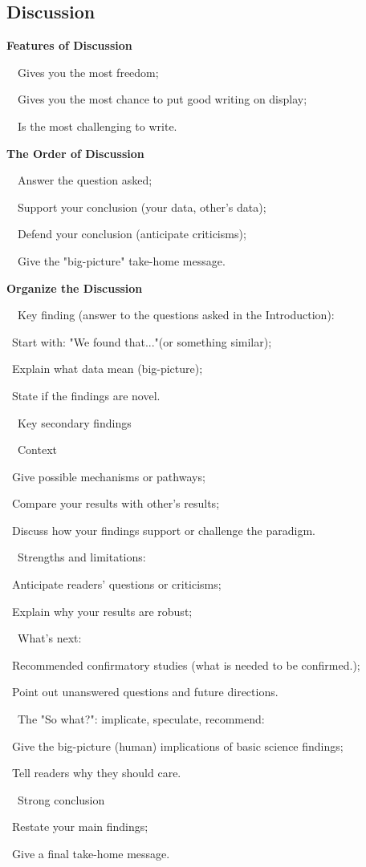 \documentclass[a4paper, 12pt]{article}
\begin{document}
\newpage\subsection{Discussion}

\textbf{Features of Discussion}
\par\ \textbullet\ Gives you the most freedom;
\par\ \textbullet\ Gives you the most chance to put good writing on display;
\par\ \textbullet\ Is the most challenging to write.

\textbf{The Order of Discussion}
\par\ \textbullet\ Answer the question asked;
\par\ \textbullet\ Support your conclusion (your data, other's data);
\par\ \textbullet\ Defend your conclusion (anticipate criticisms);
\par\ \textbullet\ Give the "big-picture" take-home message.

\newpage\textbf{Organize the Discussion}
\par\ \textbullet\ Key finding (answer to the questions asked in the Introduction):
\par\quad\textopenbullet\ Start with: "We found that..."(or something similar);
\par\quad\textopenbullet\ Explain what data mean (big-picture);
\par\quad\textopenbullet\ State if the findings are novel.
\par\ \textbullet\ Key secondary findings
\par\ \textbullet\ Context
\par\quad\textopenbullet\ Give possible mechanisms or pathways;
\par\quad\textopenbullet\ Compare your results with other's results;
\par\quad\textopenbullet\ Discuss how your findings support or challenge the paradigm.
\par\ \textbullet\ Strengths and limitations:
\par\quad\textopenbullet\ Anticipate readers' questions or criticisms;
\par\quad\textopenbullet\ Explain why your results are robust;
\par\ \textbullet\ What's next:
\par\quad\textopenbullet\ Recommended confirmatory studies (what is needed to be confirmed.);
\par\quad\textopenbullet\ Point out unanswered questions and future directions.
\par\ \textbullet\ The "So what?": implicate, speculate, recommend:
\par\quad\textopenbullet\ Give the big-picture (human) implications of basic science findings;
\par\quad\textopenbullet\ Tell readers why they should care.
\par\ \textbullet\ Strong conclusion
\par\quad\textopenbullet\ Restate your main findings;
\par\quad\textopenbullet\ Give a final take-home message.
\end{document}
